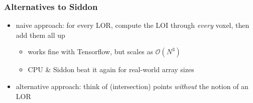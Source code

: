\documentclass{beamer}
\begin{document}
\begin{frame}
  \frametitle{Alternatives to Siddon}
  \begin{itemize}
    \item naive approach: for every LOR, compute the LOI through \textsl{every} voxel, then add them all up
      \begin{itemize}
        \item works fine with Tensorflow, but scales as $\mathcal{O}(N^3)$
        \item CPU \& Siddon beat it again for real-world array sizes
      \end{itemize}
    \item alternative approach: think of (intersection) points \textsl{without} the notion of an LOR
  \end{itemize}
  \begin{figure}
    \centering
  \end{figure}
\end{frame}
\end{document}
